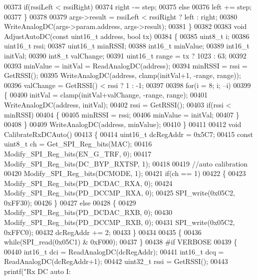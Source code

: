 \begin{DoxyCode}
{{{{{{{00373         \textcolor{keywordflow}{if}(rssiLeft < rssiRight)
00374             right -= step;
00375         \textcolor{keywordflow}{else}
00376             left += step;
00377     \}
00378 
00379     args->result = rssiLeft < rssiRight ? left : right;
00380     WriteAnalogDC(args->param.address, args->result);
00381 \}
00382 
00383 \textcolor{keywordtype}{void} AdjustAutoDC(\textcolor{keyword}{const} uint16\_t address, \textcolor{keywordtype}{bool} tx)
00384 \{
00385     uint8\_t i;
00386     uint16\_t rssi;
00387     uint16\_t minRSSI;
00388     int16\_t minValue;
00389     int16\_t initVal;
00390     int8\_t valChange;
00391     uint16\_t range = tx ? 1023 : 63;
00392 
00393     minValue = initVal = ReadAnalogDC(address);
00394     minRSSI = rssi = GetRSSI();
00395     WriteAnalogDC(address, clamp(initVal+1, -range, range));
00396     valChange = GetRSSI() < rssi ? 1 : -1;
00397 
00398     \textcolor{keywordflow}{for}(i = 8; i; --i)
00399     \{
00400         initVal = clamp(initVal+valChange, -range, range);
00401         WriteAnalogDC(address, initVal);
00402         rssi = GetRSSI();
00403         \textcolor{keywordflow}{if}(rssi < minRSSI)
00404         \{
00405             minRSSI = rssi;
00406             minValue = initVal;
00407         \}
00408     \}
00409     WriteAnalogDC(address, minValue);
00410 \}
00411 
00412 \textcolor{keywordtype}{void} CalibrateRxDCAuto()
00413 \{
00414     uint16\_t dcRegAddr = 0x5C7;
00415     \textcolor{keyword}{const} uint8\_t ch = Get_SPI_Reg_bits(MAC);
00416     Modify_SPI_Reg_bits(EN_G_TRF, 0);
00417     Modify_SPI_Reg_bits(DC_BYP_RXTSP, 1);
00418 
00419     \textcolor{comment}{//auto calibration}
00420     Modify_SPI_Reg_bits(DCMODE, 1);
00421     \textcolor{keywordflow}{if}(ch == 1)
00422     \{
00423         Modify_SPI_Reg_bits(PD_DCDAC_RXA, 0);
00424         Modify_SPI_Reg_bits(PD_DCCMP_RXA, 0);
00425         SPI_write(0x05C2, 0xFF30);
00426     \}
00427     \textcolor{keywordflow}{else}
00428     \{
00429         Modify_SPI_Reg_bits(PD_DCDAC_RXB, 0);
00430         Modify_SPI_Reg_bits(PD_DCCMP_RXB, 0);
00431         SPI_write(0x05C2, 0xFFC0);
00432         dcRegAddr += 2;
00433     \}
00434 
00435     \{
00436         \textcolor{keywordflow}{while}(SPI_read(0x05C1) & 0xF000);
00437     \}
00438 \textcolor{preprocessor}{#if VERBOSE}
00439     \{
00440         int16\_t dci = ReadAnalogDC(dcRegAddr);
00441         int16\_t dcq = ReadAnalogDC(dcRegAddr+1);
00442         uint32\_t rssi = GetRSSI();
00443         printf(\textcolor{stringliteral}{"Rx DC auto   I: %
}}}}}}}}
\end{DoxyCode}

